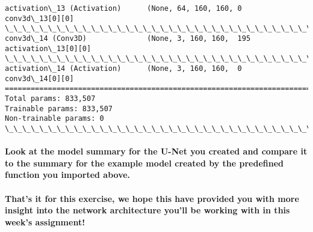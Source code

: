 \documentclass[11pt]{article}
\begin{document}
\begin{Verbatim}[commandchars=\\\{\}]
activation\_13 (Activation)      (None, 64, 160, 160, 0           conv3d\_13[0][0]                  
\_\_\_\_\_\_\_\_\_\_\_\_\_\_\_\_\_\_\_\_\_\_\_\_\_\_\_\_\_\_\_\_\_\_\_\_\_\_\_\_\_\_\_\_\_\_\_\_\_\_\_\_\_\_\_\_\_\_\_\_\_\_\_\_\_\_\_\_\_\_\_\_\_\_\_\_\_\_\_\_\_\_\_\_\_\_\_\_\_\_\_\_\_\_\_\_\_\_
conv3d\_14 (Conv3D)              (None, 3, 160, 160,  195         activation\_13[0][0]              
\_\_\_\_\_\_\_\_\_\_\_\_\_\_\_\_\_\_\_\_\_\_\_\_\_\_\_\_\_\_\_\_\_\_\_\_\_\_\_\_\_\_\_\_\_\_\_\_\_\_\_\_\_\_\_\_\_\_\_\_\_\_\_\_\_\_\_\_\_\_\_\_\_\_\_\_\_\_\_\_\_\_\_\_\_\_\_\_\_\_\_\_\_\_\_\_\_\_
activation\_14 (Activation)      (None, 3, 160, 160,  0           conv3d\_14[0][0]                  
==================================================================================================
Total params: 833,507
Trainable params: 833,507
Non-trainable params: 0
\_\_\_\_\_\_\_\_\_\_\_\_\_\_\_\_\_\_\_\_\_\_\_\_\_\_\_\_\_\_\_\_\_\_\_\_\_\_\_\_\_\_\_\_\_\_\_\_\_\_\_\_\_\_\_\_\_\_\_\_\_\_\_\_\_\_\_\_\_\_\_\_\_\_\_\_\_\_\_\_\_\_\_\_\_\_\_\_\_\_\_\_\_\_\_\_\_\_

    \end{Verbatim}

    \hypertarget{look-at-the-model-summary-for-the-u-net-you-created-and-compare-it-to-the-summary-for-the-example-model-created-by-the-predefined-function-you-imported-above.}{%
\paragraph{Look at the model summary for the U-Net you created and
compare it to the summary for the example model created by the
predefined function you imported
above.}\label{look-at-the-model-summary-for-the-u-net-you-created-and-compare-it-to-the-summary-for-the-example-model-created-by-the-predefined-function-you-imported-above.}}

    \hypertarget{thats-it-for-this-exercise-we-hope-this-have-provided-you-with-more-insight-into-the-network-architecture-youll-be-working-with-in-this-weeks-assignment}{%
\paragraph{That's it for this exercise, we hope this have provided you
with more insight into the network architecture you'll be working with
in this week's
assignment!}\label{thats-it-for-this-exercise-we-hope-this-have-provided-you-with-more-insight-into-the-network-architecture-youll-be-working-with-in-this-weeks-assignment}}


    
    
    
    
\end{document}
